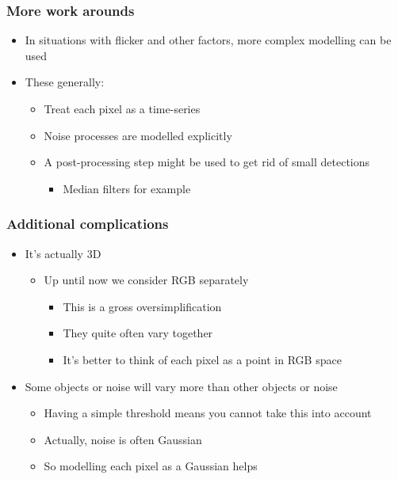 \documentclass[a4paper]{article}
\begin{document}
\subsubsection{More work arounds}
\label{sec-4-1-3}
\begin{itemize}
\item In situations with flicker and other factors, more complex modelling can be used
\item These generally:
\begin{itemize}
\item Treat each pixel as a time-series
\item Noise processes are modelled explicitly
\item A post-processing step might be used to get rid of small detections
\begin{itemize}
\item Median filters for example
\end{itemize}
\end{itemize}
\end{itemize}

\subsubsection{Additional complications}
\label{sec-4-1-4}
\begin{itemize}
\item It's actually 3D
\begin{itemize}
\item Up until now we consider RGB separately
\begin{itemize}
\item This is a gross oversimplification
\item They quite often vary together
\item It's better to think of each pixel as a point in RGB space
\end{itemize}
\end{itemize}
\item Some objects or noise will vary more than other objects or noise
\begin{itemize}
\item Having a simple threshold means you cannot take this into account
\item Actually, noise is often Gaussian
\item So modelling each pixel as a Gaussian helps
\end{itemize}
\end{itemize}
\end{document}
